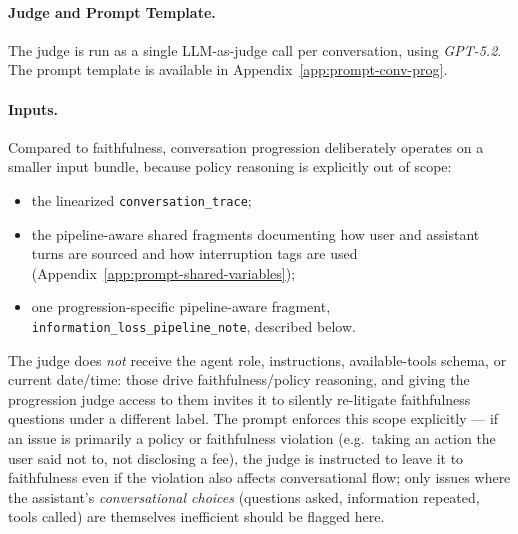 \paragraph{Judge and Prompt Template.} The judge is run as a single LLM-as-judge call per conversation, using \emph{GPT-5.2}. The prompt template is available in Appendix~\ref{app:prompt-conv-prog}.

\paragraph{Inputs.} Compared to faithfulness, conversation progression deliberately operates on a smaller input bundle, because policy reasoning is explicitly out of scope:
\begin{itemize}
    \item the linearized \texttt{conversation\_trace};
    \item the pipeline-aware shared fragments documenting how user and assistant turns are sourced and how interruption tags are used (Appendix~\ref{app:prompt-shared-variables});
    \item one progression-specific pipeline-aware fragment, \texttt{information\_loss\_pipeline\_note}, described below.
\end{itemize}
The judge does \emph{not} receive the agent role, instructions, available-tools schema, or current date/time: those drive faithfulness/policy reasoning, and giving the progression judge access to them invites it to silently re-litigate faithfulness questions under a different label. The prompt enforces this scope explicitly --- if an issue is primarily a policy or faithfulness violation (e.g.\ taking an action the user said not to, not disclosing a fee), the judge is instructed to leave it to faithfulness even if the violation also affects conversational flow; only issues where the assistant's \emph{conversational choices} (questions asked, information repeated, tools called) are themselves inefficient should be flagged here.

